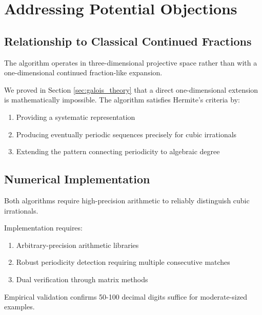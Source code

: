 \section{Addressing Potential Objections}\label{sec:objections}

\subsection{Relationship to Classical Continued Fractions}

\begin{objection}
The \HAPD{} algorithm operates in three-dimensional projective space rather than with a one-dimensional continued fraction-like expansion.
\end{objection}

\begin{response}
We proved in Section \ref{sec:galois_theory} that a direct one-dimensional extension is mathematically impossible. The \HAPD{} algorithm satisfies Hermite's criteria by:
\begin{enumerate}
\item Providing a systematic representation
\item Producing eventually periodic sequences precisely for cubic irrationals
\item Extending the pattern connecting periodicity to algebraic degree
\end{enumerate}
\end{response}

\subsection{Numerical Implementation}

\begin{objection}
Both algorithms require high-precision arithmetic to reliably distinguish cubic irrationals.
\end{objection}

\begin{response}
Implementation requires:
\begin{enumerate}
\item Arbitrary-precision arithmetic libraries
\item Robust periodicity detection requiring multiple consecutive matches
\item Dual verification through matrix methods
\end{enumerate}
Empirical validation confirms 50-100 decimal digits suffice for moderate-sized examples.
\end{response}

